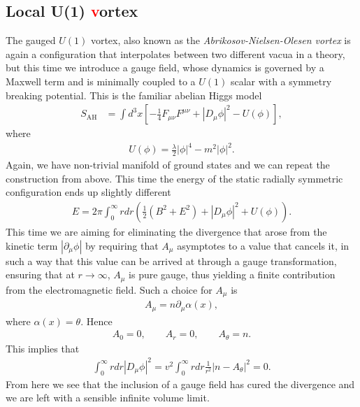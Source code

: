         \subsection{Local U(1) \textcolor{red}{v}ortex}
        The gauged $U(1)$ vortex, also known as the \textit{Abrikosov-Nielsen-Olesen vortex} is again a configuration that interpolates between two different vacua in a theory, but this time we introduce a gauge field, whose dynamics is governed by a Maxwell term and is minimally coupled to a $U(1)$ scalar with a symmetry breaking potential. This is the familiar abelian Higgs model
        \begin{align}
            S_{\text{AH}} & = \int d^3x \left[-\frac{1}{4} F_{\mu \nu} F^{\mu \nu} + | D_{\mu} \phi|^2 - U(\phi) \right], \label{eq:Abelian_Higgs_Model}
        \end{align}
        where
        \begin{align}
            U(\phi) = \frac{\lambda}{2} |\phi|^4 - m^2 |\phi|^2.
        \end{align}
    Again, we have non-trivial manifold of ground states and we can repeat the construction from above. This time the energy of the static radially symmetric configuration ends up slightly different
    \begin{align}
        E = 2 \pi \int_0^{\infty} r dr \left(\frac{1}{2}( B^2 + E^2) + |D_{\mu} \phi|^2 + U(\phi) \right) .
    \end{align}
    This time we are aiming for eliminating the divergence that arose from the kinetic term $|\partial_{\mu}\phi|$ by requiring that $A_{\mu}$ asymptotes to a value that cancels it, in such a way that this value can be arrived at through a gauge transformation, ensuring that at $r\rightarrow \infty$, $A_{\mu}$ is pure gauge, thus yielding a finite contribution from the electromagnetic field. Such a choice for $A_{\mu}$ is
    \begin{align}
        A_{\mu} = n \partial_{\mu} \alpha(x),
    \end{align}
    where $\alpha(x) = \theta$. Hence
    \begin{align}
        A_0 =0, \qquad A_r =0, \qquad A_{\theta} = n.
    \end{align}
    This implies that
    \begin{align}
        \int_0^{\infty} r dr |D_{\mu}\phi|^2 = v^2\int_0^{\infty} r dr  \frac{1}{r^2}|n-A_{\theta}|^2 =0.
    \end{align}
    From here we see that the inclusion of a gauge field has cured the divergence and we are left with a sensible infinite volume limit. \\
